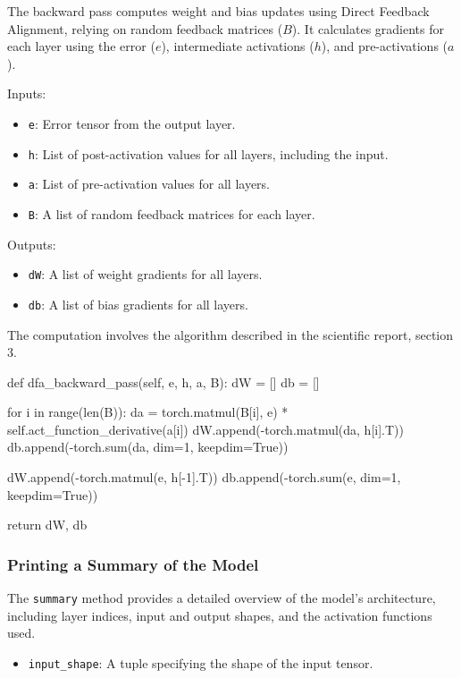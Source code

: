 \documentclass[english]{article}
\begin{document}
The backward pass computes weight and bias updates using Direct Feedback Alignment, relying on random feedback matrices (\(B\)). It calculates gradients for each layer using the error (\(e\)), intermediate activations (\(h\)), and pre-activations (\(a\)).

Inputs:
\begin{itemize}
    \item \texttt{e}: Error tensor from the output layer.
    \item \texttt{h}: List of post-activation values for all layers, including the input.
    \item \texttt{a}: List of pre-activation values for all layers.
    \item \texttt{B}: A list of random feedback matrices for each layer.
\end{itemize}

Outputs:
\begin{itemize}
    \item \texttt{dW}: A list of weight gradients for all layers.
    \item \texttt{db}: A list of bias gradients for all layers.
\end{itemize}

The computation involves the algorithm described in the scientific report, section 3.

\begin{python}
def dfa_backward_pass(self, e, h, a, B):
    dW = []
    db = []

    for i in range(len(B)):
        da = torch.matmul(B[i], e) * self.act_function_derivative(a[i])
        dW.append(-torch.matmul(da, h[i].T))
        db.append(-torch.sum(da, dim=1, keepdim=True))

    dW.append(-torch.matmul(e, h[-1].T))
    db.append(-torch.sum(e, dim=1, keepdim=True))

    return dW, db
\end{python}

\subsubsection{Printing a Summary of the Model}

The \texttt{summary} method provides a detailed overview of the model's architecture, including layer indices, input and output shapes, and the activation functions used.

\begin{itemize}
    \item \texttt{input\_shape}: A tuple specifying the shape of the input tensor.
\end{itemize}
\end{document}
